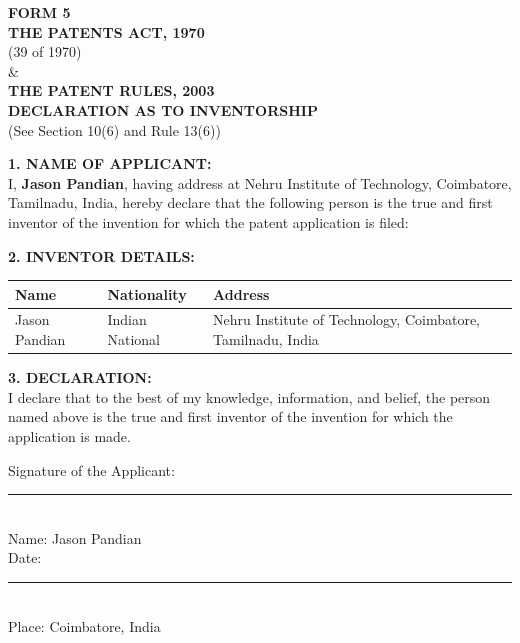 \documentclass[12pt,a4paper]{article}
\begin{document}
\begin{center}
    \textbf{\large FORM 5} \\
    \vspace{0.2cm}
    \textbf{THE PATENTS ACT, 1970} \\
    (39 of 1970) \\
    \& \\
    \textbf{THE PATENT RULES, 2003} \\
    \vspace{0.4cm}
    \textbf{\large DECLARATION AS TO INVENTORSHIP} \\
    (See Section 10(6) and Rule 13(6)) \\
\end{center}

\vspace{1cm}

\noindent \textbf{1. NAME OF APPLICANT:} \\
I, \textbf{Jason Pandian}, having address at Nehru Institute of Technology, Coimbatore, Tamilnadu, India, hereby declare that the following person is the true and first inventor of the invention for which the patent application is filed:

\vspace{0.5cm}

\noindent \textbf{2. INVENTOR DETAILS:}
\begin{table}[h!]
\centering
\begin{tabular}{|p{3cm}|p{2cm}|p{8cm}|}
\hline
\textbf{Name} & \textbf{Nationality} & \textbf{Address} \\ \hline
Jason Pandian & Indian National & Nehru Institute of Technology, Coimbatore, Tamilnadu, India \\ \hline
\end{tabular}
\end{table}

\vspace{0.5cm}

\noindent \textbf{3. DECLARATION:} \\
I declare that to the best of my knowledge, information, and belief, the person named above is the true and first inventor of the invention for which the application is made.

\vspace{2cm}

\noindent Signature of the Applicant: \rule{5cm}{0.4pt} \\
Name: Jason Pandian \\
Date: \rule{5cm}{0.4pt} \\
Place: Coimbatore, India
\end{document}
